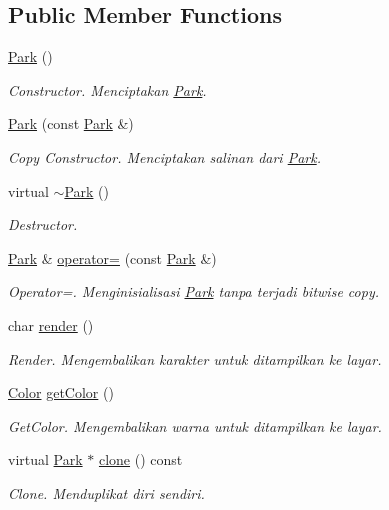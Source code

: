 \subsection*{Public Member Functions}
\begin{DoxyCompactItemize}
\item 
\hyperlink{classPark_a56d1f4a8bbab72856a17a8de83898f1a}{Park} ()
\begin{DoxyCompactList}\small\item\em Constructor. Menciptakan \hyperlink{classPark}{Park}. \end{DoxyCompactList}\item 
\hyperlink{classPark_ab60984ca006dcb34568dba4308ea858c}{Park} (const \hyperlink{classPark}{Park} \&)
\begin{DoxyCompactList}\small\item\em Copy Constructor. Menciptakan salinan dari \hyperlink{classPark}{Park}. \end{DoxyCompactList}\item 
virtual \hyperlink{classPark_aae611d70a5a38a5716cb2358a4a62c7c}{$\sim$\+Park} ()
\begin{DoxyCompactList}\small\item\em Destructor. \end{DoxyCompactList}\item 
\hyperlink{classPark}{Park} \& \hyperlink{classPark_aefd718f71cb2061f2050d5af4b63d202}{operator=} (const \hyperlink{classPark}{Park} \&)
\begin{DoxyCompactList}\small\item\em Operator=. Menginisialisasi \hyperlink{classPark}{Park} tanpa terjadi bitwise copy. \end{DoxyCompactList}\item 
char \hyperlink{classPark_a43155d9ce8ce04264d004970e8e838be}{render} ()
\begin{DoxyCompactList}\small\item\em Render. Mengembalikan karakter untuk ditampilkan ke layar. \end{DoxyCompactList}\item 
\hyperlink{color_8h_ab87bacfdad76e61b9412d7124be44c1c}{Color} \hyperlink{classPark_ab03596b80f84ce005d879cae98d7ac5e}{get\+Color} ()
\begin{DoxyCompactList}\small\item\em Get\+Color. Mengembalikan warna untuk ditampilkan ke layar. \end{DoxyCompactList}\item 
virtual \hyperlink{classPark}{Park} $\ast$ \hyperlink{classPark_a94b4494ebee327cbee81ca6b95d11532}{clone} () const 
\begin{DoxyCompactList}\small\item\em Clone. Menduplikat diri sendiri. \end{DoxyCompactList}\end{DoxyCompactItemize}
